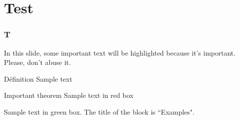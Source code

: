 \documentclass{beamer}
\begin{document}
\section{Test}

\begin{frame}
	\frametitle{T}
	
	In this slide, some important text will be
	\alert{highlighted} because it's important.
	Please, don't abuse it.
	
	\begin{block}{Définition}
		Sample text
	\end{block}
	
	\begin{alertblock}{Important theorem}
		Sample text in red box
	\end{alertblock}
	
	\begin{examples}
		Sample text in green box. The title of the block is ``Examples".
	\end{examples}
\end{frame}
\end{document}
